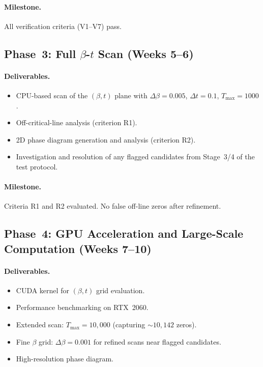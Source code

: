 \paragraph{Milestone.}
All verification criteria (V1--V7) pass.


\subsection*{Phase~3: Full $\beta$-$t$ Scan (Weeks 5--6)}

\paragraph{Deliverables.}
\begin{itemize}
  \item CPU-based scan of the $(\beta, t)$ plane with $\Delta\beta = 0.005$,
        $\Delta t = 0.1$, $T_{\max} = 1000$.
  \item Off-critical-line analysis (criterion R1).
  \item 2D phase diagram generation and analysis (criterion R2).
  \item Investigation and resolution of any flagged candidates from Stage~3/4 of the
        test protocol.
\end{itemize}

\paragraph{Milestone.}
Criteria R1 and R2 evaluated. No false off-line zeros after refinement.


\subsection*{Phase~4: GPU Acceleration and Large-Scale Computation (Weeks 7--10)}

\paragraph{Deliverables.}
\begin{itemize}
  \item CUDA kernel for $(\beta, t)$ grid evaluation.
  \item Performance benchmarking on RTX~2060.
  \item Extended scan: $T_{\max} = 10{,}000$ (capturing $\sim 10{,}142$ zeros).
  \item Fine $\beta$ grid: $\Delta\beta = 0.001$ for refined scans near flagged
        candidates.
  \item High-resolution phase diagram.
\end{itemize}

